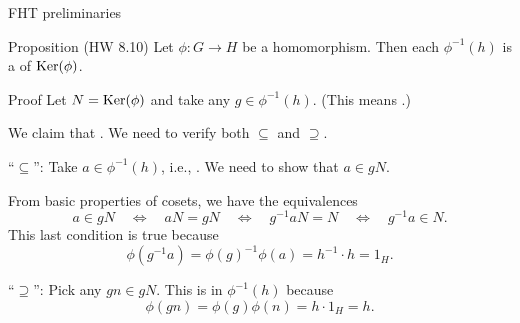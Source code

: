 \documentclass[8pt, handout]{beamer}
\newcommand{\Pause}{}      %
\begin{document}
\begin{frame}{FHT preliminaries}
  
  \begin{block}{Proposition (HW 8.10)}
    Let $\phi\colon G\to H$ be a homomorphism. Then each
     $\phi^{-1}(h)$ is a  of
    $\operatorname{Ker}(\phi)$.
  \end{block}
  
  \begin{exampleblock}{Proof} \Pause
    Let $N=\operatorname{Ker}(\phi)$ and take any $g\in\phi^{-1}(h)$. (This means
    .) \medskip\Pause
    
    We claim that . \Pause We need to verify both
    $\subseteq$ and $\supseteq$. \medskip\pause
    
    ``$\subseteq$'': Take $a\in\phi^{-1}(h)$, i.e.,
    . \Pause We need to show that 
    $a\in gN$. \medskip\pause
    
    From basic properties of cosets, we have the equivalences
    \[
    a\in gN\Pause\quad\Longleftrightarrow\quad 
    aN=gN\Pause\quad\Longleftrightarrow\quad 
    g^{-1}aN=N \Pause\quad\Longleftrightarrow\quad 
    g^{-1}a\in N.
    \]
    \Pause This last condition is true because
    \[
    \phi(g^{-1}a)\Pause=\phi(g)^{-1}\phi(a)\Pause
    =h^{-1}\cdot h=1_H. \tag*{$\checkmark$}
    \]
    \pause
    
    ``$\supseteq$'': Pick any $gn\in gN$. \Pause This is in
    $\phi^{-1}(h)$ because
    \[
    \phi(gn)\Pause=\phi(g)\phi(n)\Pause=h\cdot 1_H\Pause=h. \tag*{$\checkmark$}
    \]
    \vspace{-3mm}
  \end{exampleblock}
    
\end{frame}

\end{document}

